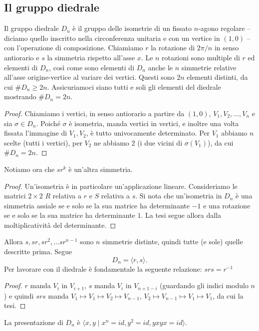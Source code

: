 \hypertarget{diedrale}{\subsection{Il gruppo diedrale}}
    Il gruppo diedrale $D_n$ è il gruppo delle isometrie di un fissato $n$-agono regolare -- diciamo quello inscritto nella circonferenza unitaria e con un vertice in $(1,0)$ -- con l'operazione di composizione. Chiamiamo $r$ la rotazione di $2\pi/n$ in senso antiorario e $s$ la simmetria rispetto all'asse $x$. Le $n$ rotazioni sono multiple di $r$ ed elementi di $D_n$, così come sono elementi di $D_n$ anche le $n$ simmetrie relative all'asse origine-vertice al variare dei vertici. Questi sono $2n$ elementi distinti, da cui $\#D_n \geq 2n$. Assicuriamoci siano tutti e soli gli elementi del diedrale mostrando $\#D_n = 2n$.
\begin{proof}
    Chiamiamo i vertici, in senso antiorario a partire da $(1,0)$, $V_1, V_2, \dots, V_n$ e sia $\sigma \in D_n$. Poiché $\sigma$ è isometria, manda vertici in vertici, e inoltre una volta fissata l'immagine di $V_1,V_2$, è tutto univocamente determinato. Per $V_1$ abbiamo $n$ scelte (tutti i vertici), per $V_2$ ne abbiamo 2 (i due vicini di $\sigma(V_1)$), da cui $\#D_n = 2n$. 
\end{proof}
Notiamo ora che $sr^k$ è un'altra simmetria.
\begin{proof}
    Un'isometria è in particolare un'applicazione lineare. Consideriamo le matrici $2\times 2$ $R$ relativa a $r$ e $S$ relativa a $s$. Si nota che un'isometria in $D_n$ è una simmetria assiale se e solo se la sua matrice ha determinante $-1$ e una rotazione se e solo se la sua matrice ha determinante $1$. La tesi segue allora dalla moltiplicatività del determinante. 
\end{proof}
    Allora $s, sr, sr^2, \dots sr^{n-1}$ sono $n$ simmetrie distinte, quindi tutte (e sole) quelle descritte prima. Segue
    \[
        D_n = \langle r, s \rangle.
    \]
    Per lavorare con il diedrale è fondamentale la seguente relazione: $srs = r^{-1}$
\begin{proof}
    $r$ manda $V_i$ in $V_{i+1}$, $s$ manda $V_i$ in $V_{n+1-i}$ (guardando gli indici modulo $n$) e quindi $srs$ manda $V_1 \mapsto V_1 \mapsto V_2 \mapsto V_{n-1}$, $V_2 \mapsto V_{n-1} \mapsto V_1 \mapsto V_1$,  da cui la tesi.
\end{proof}
    La presentazione di $D_n$ è $\langle x,y \mid x^n = id, y^2 = id, yxyx = id\rangle$.
    
